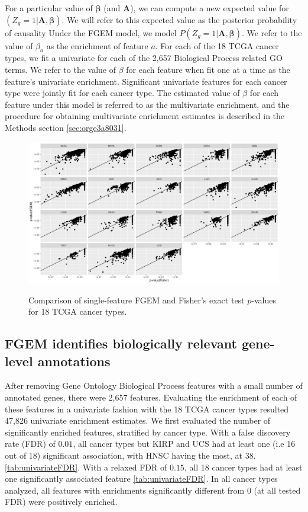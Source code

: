 For a particular value of $\boldsymbol{\beta}$ (and $\textbf{A}$), we can compute a new expected value for $(Z_g = 1 | \textbf{A},\boldsymbol{\beta})$.  We will refer to this expected value as the posterior probability of causality      Under the FGEM model, we model $P(Z_g = 1 | \textbf{A},\boldsymbol{\beta})$.  We refer to the value of $\beta_a$ as the enrichment of feature $a$.  For each of the 18 TCGA cancer types, we fit a univariate for each of the 2,657 Biological Process related GO terms.  We refer to the value of $\beta$ for each feature when fit one at a time as the feature's univariate enrichment.  Significant univariate features for each cancer type were jointly fit for each cancer type.  The estimated value of $\beta$ for each feature under this model is referred to as the multivariate enrichment, and the procedure for obtaining multivariate enrichment estimates is described in the Methods section \ref{sec:orge3a8031}.

\begin{figure}
\centering
\includegraphics[width=.9\linewidth]{img/fisher_vs_fgem.png}\label{fig:fisher_vs_fgem}
\caption{Comparison of single-feature FGEM and Fisher's exact test $p$-values for 18 TCGA cancer types.}
\end{figure}

\subsection{FGEM identifies biologically relevant gene-level annotations}\label{sec:orgd52f2ca}

After removing Gene Ontology Biological Process features with a small number of annotated genes, there were 2,657 features.  Evaluating the enrichment of each of these features in a univariate fashion with the 18 TCGA cancer types resulted 47,826 univariate enrichment estimates.  We first evaluated the number of significantly enriched features, stratified by cancer type.  With a false discovery rate (FDR) of $0.01$, all cancer types but KIRP and UCS had at least one (i.e 16 out of 18) significant association, with HNSC having the most, at 38. \ref{tab:univariateFDR}.  With a relaxed FDR of $0.15$, all 18 cancer types had at least one significantly associated feature \ref{tab:univariateFDR}. In all cancer types analyzed, all features with enrichments significantly different from 0 (at all tested FDR)  were positively enriched.  


